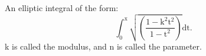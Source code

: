 An elliptic integral of the form:
\[ \int _{0} ^{\mathrm{x}}
\sqrt { \left ( \frac{1 - \mathrm{k}^2 \mathrm{t}^2 } 
{ 1 - \mathrm{t}^2 } \right ) } \mathrm{dt} . \]
k is called the modulus, and n is called the parameter.